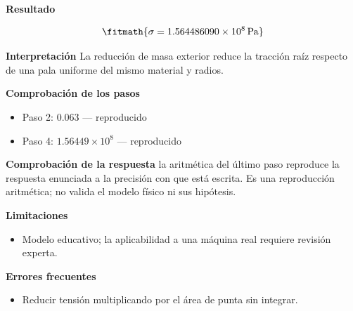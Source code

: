 \documentclass[10pt,openany]{book}
\begin{document}
\begin{tcolorbox}[title={Problema resuelto 2}, studiumworked, breakable]
\noindent\textbf{Resultado}

\[
\fitmath{\sigma=1.564486090\times10^{8}\,\mathrm{Pa}}
\]

\noindent\textbf{Interpretación}
La reducción de masa exterior reduce la tracción raíz respecto de una pala uniforme del mismo material y radios.

\noindent\textbf{Comprobación de los pasos}
\begin{itemize}
\item Paso 2: $0.063$ — reproducido
\item Paso 4: $1.56449\times 10^{8}$ — reproducido
\end{itemize}

\noindent\textbf{Comprobación de la respuesta} la aritmética del último paso reproduce la respuesta enunciada a la precisión con que está escrita. Es una reproducción aritmética; no valida el modelo físico ni sus hipótesis.

\noindent\textbf{Limitaciones}
\begin{itemize}
\item Modelo educativo; la aplicabilidad a una máquina real requiere revisión experta.
\end{itemize}

\noindent\textbf{Errores frecuentes}
\begin{itemize}
\item Reducir tensión multiplicando por el área de punta sin integrar.
\end{itemize}
\end{tcolorbox}
\end{document}
